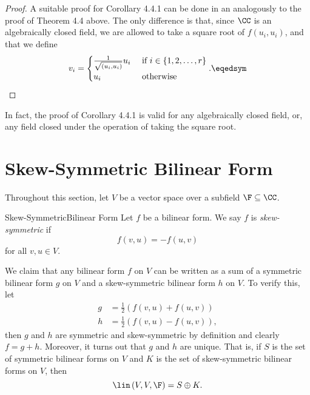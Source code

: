 \documentclass[linearalgebraII]{subfiles}
\begin{document}
    \begin{proof}
        A suitable proof for Corollary 4.4.1 can be done in an analogously to the proof of Theorem 4.4 above. The only difference is that, since $\CC$ is an algebraically closed field, we are allowed to take a square root of $f\left( u_i,u_i \right)$, and that we define
        \begin{equation*}
            v_i = 
            \begin{cases} 
                \frac{1}{\sqrt{\left( u_i,u_i \right) }}u_i & \text{ if } i\in\left\lbrace 1,2,\ldots,r \right\rbrace \\ 
                u_i & \text{ otherwise }
            \end{cases}. \eqedsym
        \end{equation*}
    \end{proof}

    \noindent In fact, the proof of Corollary 4.4.1 is valid for any algebraically closed field, or, any field closed under the operation of taking the square root. 
    
    \section{Skew-Symmetric Bilinear Form}

    \begin{remark}
        Throughout this section, let $V$ be a vector space over a subfield $\F\subseteq\CC$.
    \end{remark}

    \begin{definition}{Skew-Symmetric}{Bilinear Form}
        Let $f$ be a bilinear form. We say $f$ is \emph{skew-symmetric} if
        \begin{equation*}
            f(v,u) = -f(u,v)
        \end{equation*}
        for all $v,u\in V$.
    \end{definition}
    
    \begin{remark}
        We claim that any bilinear form $f$ on $V$ can be written as a sum of a symmetric bilinear form $g$ on $V$ and a skew-symmetric bilinear form $h$ on $V$. To verify this, let
        \begin{align*}
            g & = \frac{1}{2} \left( f(v,u) + f(u,v) \right) \\
            h & = \frac{1}{2} \left( f(v,u) - f(u,v) \right) ,
        \end{align*} 
        then $g$ and $h$ are symmetric and skew-symmetric by definition and clearly $f=g+h$. Moreover, it turns out that $g$ and $h$ are unique. That is, if $S$ is the set of symmetric bilinear forms on $V$ and $K$ is the set of skew-symmetric bilinear forms on $V$, then
        \begin{equation*}
            \lin\left( V,V,\F \right) = S\oplus K.
        \end{equation*}
    \end{remark}
\end{document}
